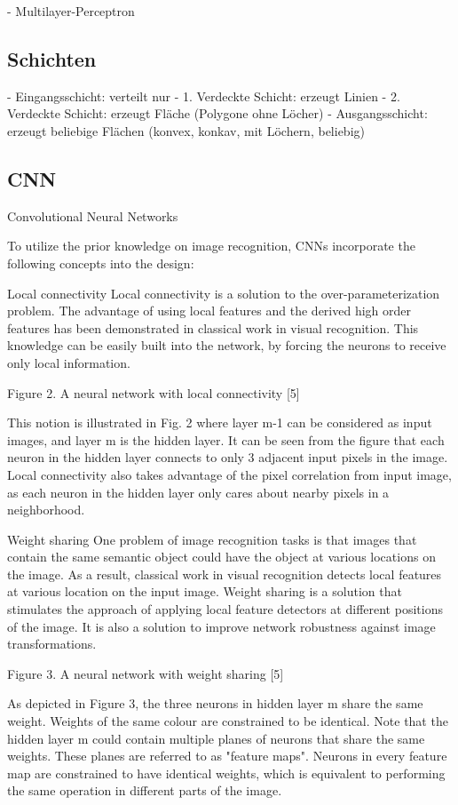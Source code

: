 \documentclass{sig-alternate-05-2015}
\begin{document}
- Multilayer-Perceptron
\subsection{Schichten}

- Eingangsschicht: verteilt nur
- 1. Verdeckte Schicht: erzeugt Linien
- 2. Verdeckte Schicht: erzeugt Fläche (Polygone ohne Löcher)
- Ausgangsschicht: erzeugt beliebige Flächen (konvex, konkav, mit Löchern, beliebig)
\subsection{CNN}
Convolutional Neural Networks

To utilize the prior knowledge on image recognition, CNNs incorporate the following concepts into the design:

Local connectivity
Local connectivity is a solution to the over-parameterization problem. The advantage of using local features and the derived high order features has been demonstrated in classical work in visual recognition. This knowledge can be easily built into the network, by forcing the neurons to receive only local information.


Figure 2. A neural network with local connectivity [5]

This notion is illustrated in Fig. 2 where layer m-1 can be considered as input images, and layer m is the hidden layer. It can be seen from the figure that each neuron in the hidden layer connects to only 3 adjacent input pixels in the image. Local connectivity also takes advantage of the pixel correlation from input image, as each neuron in the hidden layer only cares about nearby pixels in a neighborhood.

Weight sharing
One problem of image recognition tasks is that images that contain the same semantic object could have the object at various locations on the image. As a result, classical work in visual recognition detects local features at various location on the input image. Weight sharing is a solution that stimulates the approach of applying local feature detectors at different positions of the image. It is also a solution to improve network robustness against image transformations.


Figure 3. A neural network with weight sharing [5]

As depicted in Figure 3, the three neurons in hidden layer m share the same weight. Weights of the same colour are constrained to be identical. Note that the hidden layer m could contain multiple planes of neurons that share the same weights. These planes are referred to as "feature maps". Neurons in every feature map are constrained to have identical weights, which is equivalent to performing the same operation in different parts of the image.
\end{document}
